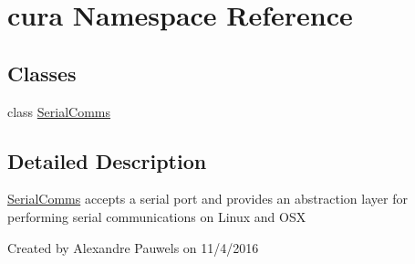 \hypertarget{namespacecura}{}\section{cura Namespace Reference}
\label{namespacecura}
\subsection*{Classes}
\begin{DoxyCompactItemize}
\item 
class \hyperlink{classcura_1_1_serial_comms}{Serial\+Comms}
\end{DoxyCompactItemize}


\subsection{Detailed Description}
\hyperlink{classcura_1_1_serial_comms}{Serial\+Comms} accepts a serial port and provides an abstraction layer for performing serial communications on Linux and O\+SX

Created by Alexandre Pauwels on 11/4/2016 